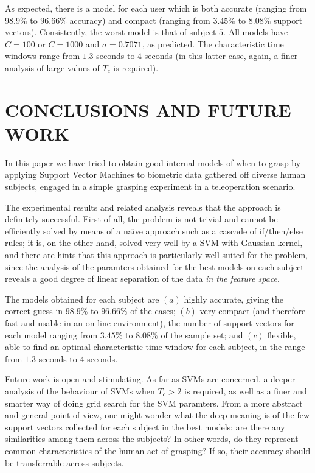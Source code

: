 \documentclass[a4paper,10pt,conference]{ieeeconf}
\begin{document}
As expected, there is a model for each user which is both accurate
(ranging from $98.9\%$ to $96.66\%$ accuracy) and compact (ranging
from $3.45\%$ to $8.08\%$ support vectors). Consistently, the worst
model is that of subject $5$. All models have $C=100$ or $C=1000$ and
$\sigma=0.7071$, as predicted. The characteristic time windows range
from $1.3$ seconds to $4$ seconds (in this latter case, again, a finer
analysis of large values of $T_c$ is required).

\section{CONCLUSIONS AND FUTURE WORK}
\label{sec:con}

In this paper we have tried to obtain good internal models of when to
grasp by applying Support Vector Machines to biometric data gathered
off diverse human subjects, engaged in a simple grasping experiment in
a teleoperation scenario.

The experimental results and related analysis reveals that the
approach is definitely successful. First of all, the problem is not
trivial and cannot be efficiently solved by means of a na\"\i ve
approach such as a cascade of if/then/else rules; it is, on the other
hand, solved very well by a SVM with Gaussian kernel, and there are
hints that this approach is particularly well suited for the problem,
since the analysis of the paramters obtained for the best models on
each subject reveals a good degree of linear separation of the data
\emph{in the feature space}.

The models obtained for each subject are $(a)$ highly accurate, giving
the correct guess in $98.9\%$ to $96.66\%$ of the cases; $(b)$ very
compact (and therefore fast and usable in an on-line environment), the
number of support vectors for each model ranging from $3.45\%$ to
$8.08\%$ of the sample set; and $(c)$ flexible, able to find an
optimal characteristic time window for each subject, in the range from
$1.3$ seconds to $4$ seconds.

Future work is open and stimulating. As far as SVMs are concerned, a
deeper analysis of the behaviour of SVMs when $T_c>2$ is required, as
well as a finer and smarter way of doing grid search for the SVM
paramters. From a more abstract and general point of view, one might
wonder what the deep meaning is of the few support vectors collected
for each subject in the best models: are there any similarities among
them across the subjects? In other words, do they represent common
characteristics of the human act of grasping? If so, their accuracy
should be transferrable across subjects.
\end{document}
